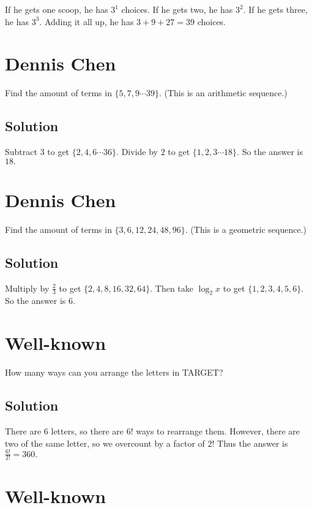\documentclass[mast]{lucky}
\begin{document}
If he gets one scoop, he has $3^1$ choices. If he gets two, he has $3^2.$ If he gets three, he has $3^3.$ Adding it all up, he has $3+9+27=39$ choices.

\pagebreak\section{Dennis Chen}

Find the amount of terms in $\{5,7,9\cdots 39\}.$ (This is an arithmetic sequence.)

\subsection{Solution}

Subtract $3$ to get $\{2,4,6\cdots 36\}.$ Divide by $2$ to get $\{1,2,3\cdots 18\}.$ So the answer is $18.$

\pagebreak\section{Dennis Chen}

Find the amount of terms in $\{3,6,12,24,48,96\}.$ (This is a geometric sequence.)

\subsection{Solution}

Multiply by $\frac{2}{3}$ to get $\{2,4,8,16,32,64\}.$ Then take $\log_2{x}$ to get $\{1,2,3,4,5,6\}.$ So the answer is $6.$

\pagebreak\section{Well-known}

How many ways can you arrange the letters in TARGET?

\subsection{Solution}

There are $6$ letters, so there are $6!$ ways to rearrange them. However, there are two of the same letter, so we overcount by a factor of $2!$ Thus the answer is $\frac{6!}{2!}=360.$

\pagebreak\section{Well-known}
\end{document}
